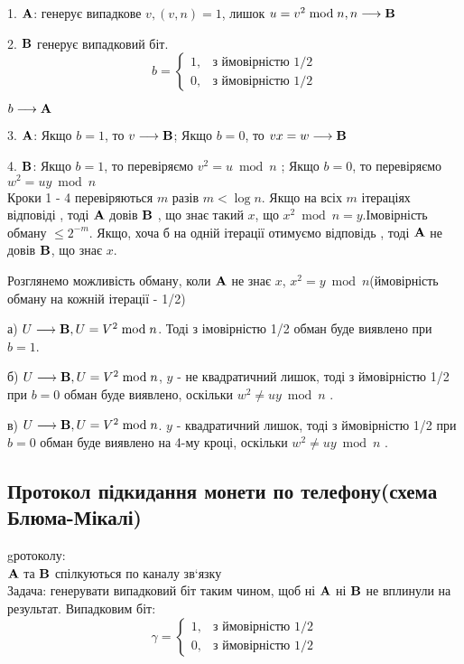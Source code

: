 1. $\bold{A}$: генерує випадкове $v, (v,n) = 1$, лишок $u = v^2\bmod n, n\longrightarrow \bold{B}$
\par2. $\bold{B}$ генерує випадковий біт. 
\begin{equation*}
b = 
	\begin{cases}
		1, &\text{з ймовірністю 1/2}\\
		0, &\text{з ймовірністю 1/2}
	\end{cases}
\end{equation*}
\begin{center}
$b \longrightarrow \bold{A}$
\end{center}
\par3. $\bold{A}$: Якщо $b = 1$, то $v\longrightarrow \bold{B}$; Якщо $b = 0$, то $vx = w\longrightarrow \bold{B}$ 
\par4. $\bold{B}$: Якщо $b = 1$, то перевіряємо $v^2 = u\bmod n$ ; Якщо $b = 0$, то перевіряємо $w^2 = uy\bmod n $\\
Кроки 1 - 4 перевіряються $m$ разів $m < \log n$. Якщо на всіх $m$ ітераціях відповіді \grqq, тоді $\bold{A}$ довів $\bold{B}$ , що знає такий $x$, що $x^2\bmod n = y$.Імовірність обману $\leqslant 2^{-m}$. Якщо, хоча б на одній ітерації отимуємо відповідь  \grqq, тоді $\bold{A}$ не довів $\bold{B}$, що знає $x$.\\


\par Розглянемо можливість обману, коли $\bold{A}$ не знає $x$, $x^2 = y\bmod n$(ймовірність обману на кожній ітерації - 1/2) 
\par а) $U\longrightarrow \bold{B}, U = V^2\bmod n$. Тоді з імовірністю 1/2 обман буде виявлено при $b = 1$.
\par б) $U\longrightarrow \bold{B}, U = V^2\bmod n$, $y$ - не квадратичний лишок, тоді з ймовірністю 1/2 при $b = 0$ обман буде виявлено, оскільки $w^2\ne uy\bmod n$ .
\par в) $U\longrightarrow \bold{B}, U = V^2\bmod n$. $y$ - квадратичний лишок, тоді з ймовірністю 1/2 при $b = 0$ обман буде виявлено на 4-му кроці, оскільки $w^2\ne uy\bmod n$ .\\


\subsection{Протокол підкидання монети по телефону(схема Блюма-Мікалі)}
 gротоколу:\\
$\bold{A}$ та $\bold{B}$ спілкуються по каналу зв`язку\\
Задача: генерувати випадковий біт таким чином, щоб ні $\bold{A}$ ні $\bold{B}$ не вплинули на результат. Випадковим біт:
\begin{equation*}
\gamma = 
	\begin{cases}
		1, &\text{з ймовірністю 1/2}\\
		0, &\text{з ймовірністю 1/2}
	\end{cases}
\end{equation*}\\


